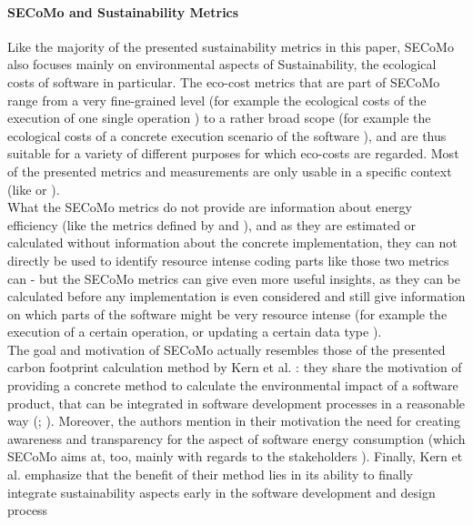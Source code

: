 \documentclass[oribibl]{llncs}
\begin{document}
\paragraph{SECoMo and Sustainability Metrics}
Like the majority of the presented sustainability metrics %
in this paper, SECoMo also focuses mainly %
 on environmental aspects of Sustainability, the ecological costs of software in particular. The eco-cost metrics that are part of SECoMo range from a very fine-grained level (for example the ecological costs of the execution of one single operation \cite{schulze_cost_2016}) to a rather broad scope (for example the ecological costs of a concrete execution scenario of the software \cite{schulze_cost_2016}), and are thus suitable for a variety of different purposes for which eco-costs are regarded. Most of the presented metrics and measurements are only usable in a specific context (like \cite{naumann_how_2008} or \cite{capra_is_2012}).\\ %
What the SECoMo metrics do not provide are information about energy efficiency (like the metrics defined by \cite{capra_is_2012} and \cite{johann_how_2012}), and as they are estimated or calculated without information about the concrete implementation, they can not directly be used to identify resource intense coding parts like those two metrics can - but the SECoMo metrics can give even more useful insights, as they can be calculated before any implementation is even considered and still give information on which parts of the software might be very resource intense (for example the execution of a certain operation, or updating a certain data type \cite{schulze_cost_2016}).\\
The goal and motivation of SECoMo actually resembles those of the presented carbon footprint calculation method by Kern et al. \cite{kern_impacts_2015}: they share the motivation of providing a concrete method to calculate the environmental impact of a software product, that can be integrated in software development processes in a reasonable way %
(\cite{kern_impacts_2015}; \cite{schulze_cost_2016}). Moreover, the authors mention in their motivation the need for creating awareness and transparency for the aspect of software energy consumption \cite{kern_impacts_2015} (which SECoMo aims at, too, mainly with regards to the stakeholders \cite{schulze_cost_2016}). Finally, Kern et al. emphasize that the benefit of their method lies in its ability to finally integrate sustainability aspects early in the software development and design process %
\end{document}
